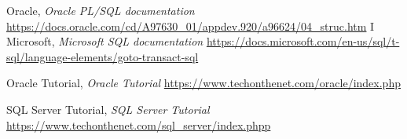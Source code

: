 \begin{thebibliography}{99999}
\singlespace\normalsize

 Oracle, \textit{Oracle PL/SQL documentation}  \url{https://docs.oracle.com/cd/A97630_01/appdev.920/a96624/04_struc.htm}
I Microsoft, \textit{Microsoft SQL documentation}  \url{https://docs.microsoft.com/en-us/sql/t-sql/language-elements/goto-transact-sql}

 Oracle Tutorial, \textit{Oracle Tutorial}  \url{https://www.techonthenet.com/oracle/index.php}

 SQL Server Tutorial, \textit{SQL Server Tutorial}  \url{https://www.techonthenet.com/sql_server/index.phpp}


\end{thebibliography}

